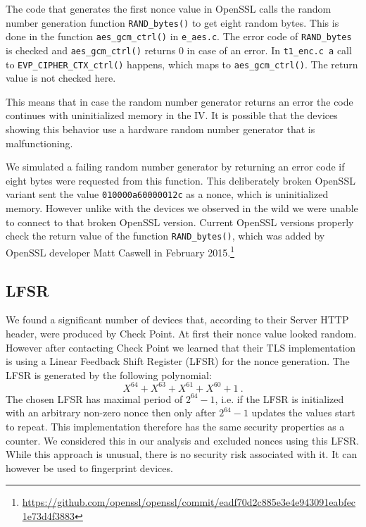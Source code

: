 The code that generates the first nonce value in OpenSSL calls the random number generation function
\texttt{RAND\_bytes()} to get eight random bytes. This is done in the function
\texttt{aes\_gcm\_ctrl()} in \texttt{e\_aes.c}. The error code of \texttt{RAND\_bytes} is checked and
\texttt{aes\_gcm\_ctrl()} returns 0 in case of an error.
In \texttt{t1\_enc.c a} call to \texttt{EVP\_CIPHER\_CTX\_ctrl()} happens, which maps to \texttt{aes\_gcm\_ctrl()}.
The return value is not checked here.

This means that in case the random number generator returns an error the code continues with uninitialized
memory in the IV. It is possible that the devices showing this behavior use a hardware random number generator
that is malfunctioning.

We simulated a failing random number generator by returning an error code if eight bytes
were requested from this function. This deliberately broken OpenSSL variant sent the value
\texttt{010000a60000012c} as a nonce, which is uninitialized memory. However unlike with the devices
we observed in the wild we were unable to connect to that broken OpenSSL version.
Current OpenSSL versions properly check the return value of the function \texttt{RAND\_bytes()}, which was added by
OpenSSL developer Matt Caswell in February 2015.\footnote{\url{https://github.com/openssl/openssl/commit/eadf70d2c885e3e4e943091eabfec1e73d4f3883}}


\subsection{LFSR}

We found a significant number of devices that, according to their Server HTTP header, were produced by Check Point. At first their nonce value looked
random. However after contacting Check Point we learned that their TLS implementation is using a Linear Feedback Shift Register (LFSR) for the nonce generation. The LFSR is generated by the following polynomial:
$$X^{64} + X^{63} + X^{61} + X^{60} + 1~.$$
The chosen LFSR has maximal period of $2^{64}-1$, i.e. if the LFSR is initialized with an arbitrary non-zero nonce then only after $2^{64}-1$ updates the values start to repeat. This implementation therefore has the same security properties as
a counter. We considered this in our analysis and excluded nonces using this LFSR. While this approach is unusual, there is no security risk associated with it.
It can however be used to fingerprint devices.

